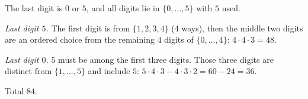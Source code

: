 The last digit is $0$ or $5$, and all digits lie in $\{0,\dots,5\}$ with $5$ used.

\emph{Last digit $5$.} The first digit is from $\{1,2,3,4\}$ ($4$ ways), then the middle two digits are an ordered choice from the remaining $4$ digits of $\{0,\dots,4\}$: $4\cdot4\cdot3=48$.

\emph{Last digit $0$.} $5$ must be among the first three digits. Those three digits are distinct from $\{1,\dots,5\}$ and include $5$: $5\cdot4\cdot3-4\cdot3\cdot2=60-24=36$.

Total $\boxed{84}$.
